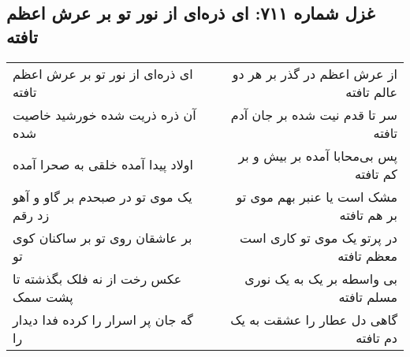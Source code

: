 \begin{center}
\section*{غزل شماره ۷۱۱: ای ذره‌ای از نور تو بر عرش اعظم تافته}
\label{sec:711}
\begin{longtable}{l p{0.5cm} r}
ای ذره‌ای از نور تو بر عرش اعظم تافته
&&
از عرش اعظم در گذر بر هر دو عالم تافته
\\
آن ذره ذریت شده خورشید خاصیت شده
&&
سر تا قدم نیت شده بر جان آدم تافته
\\
اولاد پیدا آمده خلقی به صحرا آمده
&&
پس بی‌محابا آمده بر بیش و بر کم تافته
\\
یک موی تو در صبحدم بر گاو و آهو زد رقم
&&
مشک است یا عنبر بهم موی تو بر هم تافته
\\
بر عاشقان روی تو بر ساکنان کوی تو
&&
در پرتو یک موی تو کاری است معظم تافته
\\
عکس رخت از نه فلک بگذشته تا پشت سمک
&&
بی واسطه بر یک به یک نوری مسلم تافته
\\
گه جان پر اسرار را کرده فدا دیدار را
&&
گاهی دل عطار را عشقت به یک دم تافته
\\
\end{longtable}
\end{center}

